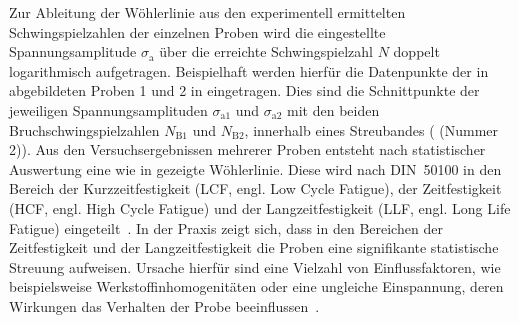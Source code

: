 Zur Ableitung der Wöhlerlinie aus den experimentell ermittelten Schwingspielzahlen der einzelnen Proben wird die eingestellte Spannungsamplitude $\sigma_{\text{a}}$ über die erreichte Schwingspielzahl $N$ doppelt logarithmisch aufgetragen. Beispielhaft werden hierfür die Datenpunkte der in  abgebildeten Proben 1 und 2 in   eingetragen. Dies sind die Schnittpunkte der jeweiligen Spannungsamplituden $\sigma_{\text{a1}}$ und $\sigma_{\text{a2}}$ mit den beiden Bruchschwingspielzahlen $N_{\text{B1}}$ und  $N_{\text{B2}}$, innerhalb eines Streubandes ( (Nummer 2)).
Aus den Versuchsergebnissen mehrerer Proben entsteht nach statistischer Auswertung eine wie in  gezeigte Wöhlerlinie. Diese wird nach DIN~50100 in den Bereich der Kurzzeitfestigkeit (LCF, engl. Low Cycle Fatigue), der Zeitfestigkeit (HCF, engl. High Cycle Fatigue) und der Langzeitfestigkeit (LLF, engl. Long Life Fatigue) eingeteilt~\cite[Seite~17]{DIN50100}. In der Praxis zeigt sich, dass in den Bereichen der Zeitfestigkeit und der Langzeitfestigkeit die Proben eine signifikante statistische Streuung aufweisen. Ursache hierfür sind eine Vielzahl von Einflussfaktoren, wie beispielsweise Werkstoffinhomogenitäten oder eine ungleiche Einspannung, deren Wirkungen das Verhalten der Probe beeinflussen~\cite[Seite~259]{Laepple2016}.

